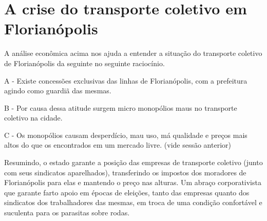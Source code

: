 \section{A crise do transporte coletivo em Florianópolis}

A análise econômica acima nos ajuda a entender a situação do
transporte coletivo de Florianópolis da seguinte no seguinte
raciocínio.

A - Existe concessões exclusivas das linhas de Florianópolis, com a
prefeitura agindo como guardiã das mesmas.

B - Por causa dessa atitude surgem micro monopólios maus no transporte
coletivo na cidade.

C - Os monopólios causam desperdício, mau uso, má qualidade e preços
mais altos do que os encontrados em um mercado livre. (vide sessão
anterior)

Resumindo, o estado garante a posição das empresas de transporte
coletivo (junto com seus sindicatos aparelhados), transferindo os
impostos dos moradores de Florianópolis para elas e mantendo o preço
nas alturas. Um abraço corporativista que garante farto apoio em
épocas de eleições, tanto das empresas quanto dos sindicatos dos
trabalhadores das mesmas, em troca de uma condição confortável e
suculenta para os parasitas sobre rodas.

